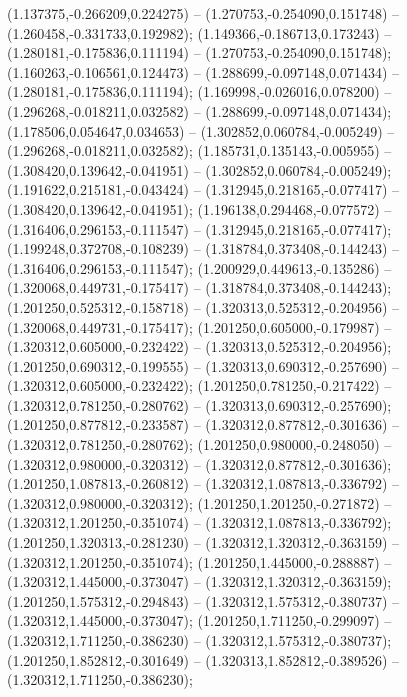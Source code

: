  (1.137375,-0.266209,0.224275) -- (1.270753,-0.254090,0.151748) -- (1.260458,-0.331733,0.192982);
 (1.149366,-0.186713,0.173243) -- (1.280181,-0.175836,0.111194) -- (1.270753,-0.254090,0.151748);
 (1.160263,-0.106561,0.124473) -- (1.288699,-0.097148,0.071434) -- (1.280181,-0.175836,0.111194);
 (1.169998,-0.026016,0.078200) -- (1.296268,-0.018211,0.032582) -- (1.288699,-0.097148,0.071434);
 (1.178506,0.054647,0.034653) -- (1.302852,0.060784,-0.005249) -- (1.296268,-0.018211,0.032582);
 (1.185731,0.135143,-0.005955) -- (1.308420,0.139642,-0.041951) -- (1.302852,0.060784,-0.005249);
 (1.191622,0.215181,-0.043424) -- (1.312945,0.218165,-0.077417) -- (1.308420,0.139642,-0.041951);
 (1.196138,0.294468,-0.077572) -- (1.316406,0.296153,-0.111547) -- (1.312945,0.218165,-0.077417);
 (1.199248,0.372708,-0.108239) -- (1.318784,0.373408,-0.144243) -- (1.316406,0.296153,-0.111547);
 (1.200929,0.449613,-0.135286) -- (1.320068,0.449731,-0.175417) -- (1.318784,0.373408,-0.144243);
 (1.201250,0.525312,-0.158718) -- (1.320313,0.525312,-0.204956) -- (1.320068,0.449731,-0.175417);
 (1.201250,0.605000,-0.179987) -- (1.320312,0.605000,-0.232422) -- (1.320313,0.525312,-0.204956);
 (1.201250,0.690312,-0.199555) -- (1.320313,0.690312,-0.257690) -- (1.320312,0.605000,-0.232422);
 (1.201250,0.781250,-0.217422) -- (1.320312,0.781250,-0.280762) -- (1.320313,0.690312,-0.257690);
 (1.201250,0.877812,-0.233587) -- (1.320312,0.877812,-0.301636) -- (1.320312,0.781250,-0.280762);
 (1.201250,0.980000,-0.248050) -- (1.320312,0.980000,-0.320312) -- (1.320312,0.877812,-0.301636);
 (1.201250,1.087813,-0.260812) -- (1.320312,1.087813,-0.336792) -- (1.320312,0.980000,-0.320312);
 (1.201250,1.201250,-0.271872) -- (1.320312,1.201250,-0.351074) -- (1.320312,1.087813,-0.336792);
 (1.201250,1.320313,-0.281230) -- (1.320312,1.320312,-0.363159) -- (1.320312,1.201250,-0.351074);
 (1.201250,1.445000,-0.288887) -- (1.320312,1.445000,-0.373047) -- (1.320312,1.320312,-0.363159);
 (1.201250,1.575312,-0.294843) -- (1.320312,1.575312,-0.380737) -- (1.320312,1.445000,-0.373047);
 (1.201250,1.711250,-0.299097) -- (1.320312,1.711250,-0.386230) -- (1.320312,1.575312,-0.380737);
 (1.201250,1.852812,-0.301649) -- (1.320313,1.852812,-0.389526) -- (1.320312,1.711250,-0.386230);
